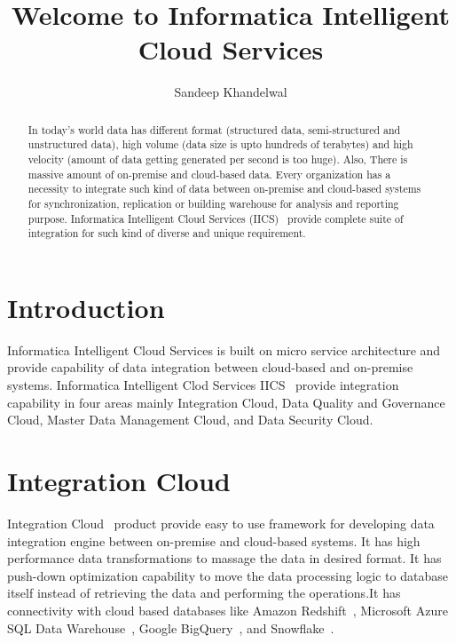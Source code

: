 \title{Welcome to Informatica Intelligent Cloud Services}

\author{Sandeep Khandelwal}

\renewcommand{\shortauthors}{S. Khandelwal}

\begin{abstract}
	
In today's world data has different format (structured data,
semi-structured and unstructured data), high volume (data size is upto
hundreds of terabytes) and high velocity (amount of data getting
generated per second is too huge). Also, There is massive amount of
on-premise and cloud-based data.  Every organization has a necessity
to integrate such kind of data between on-premise and cloud-based
systems for synchronization, replication or building warehouse for
analysis and reporting purpose. Informatica Intelligent Cloud Services
(IICS)~\cite{hid-sp18-511-iics} provide complete suite of integration
for such kind of diverse and unique requirement.

\end{abstract}



\maketitle


\section{Introduction}

Informatica Intelligent Cloud Services is built on micro service
architecture and provide capability of data integration between
cloud-based and on-premise systems. Informatica Intelligent Clod
Services IICS~\cite{hid-sp18-511-iics} provide integration capability
in four areas mainly Integration Cloud, Data Quality and Governance
Cloud, Master Data Management Cloud, and Data Security Cloud.

\section{Integration Cloud}

Integration Cloud~\cite{hid-sp18-511-iics} product provide easy to use
framework for developing data integration engine between on-premise
and cloud-based systems. It has high performance data transformations
to massage the data in desired format. It has push-down optimization
capability to move the data processing logic to database itself
instead of retrieving the data and performing the operations.It has
connectivity with cloud based databases like Amazon
Redshift~\cite{hid-sp18-511-aws-redshift}, Microsoft Azure SQL Data
Warehouse~\cite{hid-sp18-511-ms-azure-sql}, Google
BigQuery~\cite{hid-sp18-511-google-bigquery}, and
Snowflake~\cite{hid-sp18-511-snowflake}.

